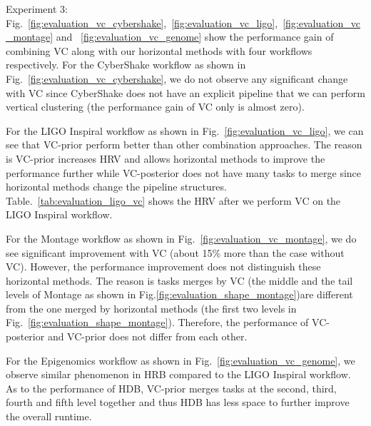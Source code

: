 Experiment 3: Fig.~\ref{fig:evaluation_vc_cybershake},~\ref{fig:evaluation_vc_ligo},~\ref{fig:evaluation_vc_montage} and ~\ref{fig:evaluation_vc_genome} show the performance gain of combining VC along with our horizontal methods with four workflows respectively. For the CyberShake workflow as shown in Fig.~\ref{fig:evaluation_vc_cybershake}, we do not observe any significant change with VC since CyberShake does not have an explicit pipeline that we can perform vertical clustering (the performance gain of VC only is almost zero). 


For the LIGO Inspiral workflow as shown in Fig.~\ref{fig:evaluation_vc_ligo}, we can see that VC-prior perform better than other combination approaches. The reason is VC-prior increases HRV and allows horizontal methods to improve the performance further while VC-posterior does not have many tasks to merge since horizontal methods change the pipeline structures. Table.~\ref{tab:evaluation_ligo_vc} shows the HRV after we perform VC on the LIGO Inspiral workflow. 

For the Montage workflow as shown in Fig.~\ref{fig:evaluation_vc_montage}, we do see significant improvement with VC (about 15\% more than the case without VC). However, the performance improvement does not distinguish these horizontal methods. The reason is tasks merges by VC (the middle and the tail levels of Montage as shown in Fig.\ref{fig:evaluation_shape_montage})are different from the one merged by horizontal methods (the first two levels in Fig.~\ref{fig:evaluation_shape_montage}). Therefore, the performance of VC-posterior and VC-prior does not differ from each other.  


For the Epigenomics workflow as shown in Fig.~\ref{fig:evaluation_vc_genome}, we observe similar phenomenon in HRB compared to the LIGO Inspiral workflow. As to the performance of HDB, VC-prior merges tasks at the second, third, fourth and fifth level together and thus HDB has less space to further improve the overall runtime. 
 
